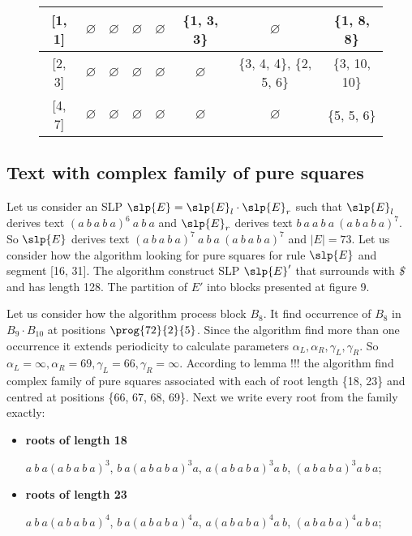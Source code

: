 \begin{appendix}
\begin{itemize}
\begin{figure}[h]
{\begin{tabular}{|c|c|c|c|c|c|c|c|}
	 	[1, 1] & $\varnothing$ & $\varnothing$ & $\varnothing$ & $\varnothing$ & \{1, 3, 3\} & $\varnothing$ & \{1, 8, 8\} \\
	 	\hline
	
	 	[2, 3] & $\varnothing$ & $\varnothing$ & $\varnothing$ & $\varnothing$ & $\varnothing$ & \{3, 4, 4\}, \{2, 5, 6\} &
	 	\{3, 10, 10\} \\ \hline
	
	 	[4, 7] & $\varnothing$ & $\varnothing$ & $\varnothing$ & $\varnothing$ & $\varnothing$ & $\varnothing$ & \{5, 5, 6\}
	 	\\ \hline
		\end{tabular}
	  }
  \end{figure}
\end{itemize}

\subsection{Text with complex family of pure squares}
Let us consider an SLP $\slp{E} = \slp{E}_l \cdot \slp{E}_r$ such that $\slp{E}_l$ derives text $(a~b~a~b~a)^6~a~b~a$
and $\slp{E}_r$ derives text $b~a~a~b~a~(a~b~a~b~a)^7$. So $\slp{E}$ derives text $(a~b~a~b~a)^7~a~b~a~(a~b~a~b~a)^7$
and $|E| = 73$. Let us consider how the algorithm looking for pure squares for rule $\slp{E}$ and segment [16, 31]. The 
algorithm construct SLP $\slp{E}'$ that surrounds with \emph{\$} and has length 128. The partition of $E'$ into blocks
presented at figure 9. 

\ComplexExamplePartititon

Let us consider how the algorithm process block $B_8$. It find occurrence of $B_8$ in $B_9 \cdot B_{10}$ at positions
$\prog{72}{2}{5}$. Since the algorithm find more than one occurrence it extends periodicity to calculate parameters
$\alpha_L, \alpha_R, \gamma_L, \gamma_R$. So $\alpha_L = \infty, \alpha_R = 69, \gamma_L = 66, \gamma_R = \infty$.
According to lemma !!! the algorithm find complex family of pure squares associated with each of root length \{18, 23\} 
and centred at positions \{66, 67, 68, 69\}. Next we write every root from the family exactly: 

\begin{itemize}
  \item \textbf{roots of length 18}

  $a~b~a(a~b~a~b~a)^3$, $b~a(a~b~a~b~a)^3a$, $a(a~b~a~b~a)^3a~b$, $(a~b~a~b~a)^3a~b~a$;
  \item \textbf{roots of length 23}
  
  $a~b~a(a~b~a~b~a)^4$, $b~a(a~b~a~b~a)^4a$, $a(a~b~a~b~a)^4a~b$, $(a~b~a~b~a)^4a~b~a$;
\end{itemize}

\end{appendix}